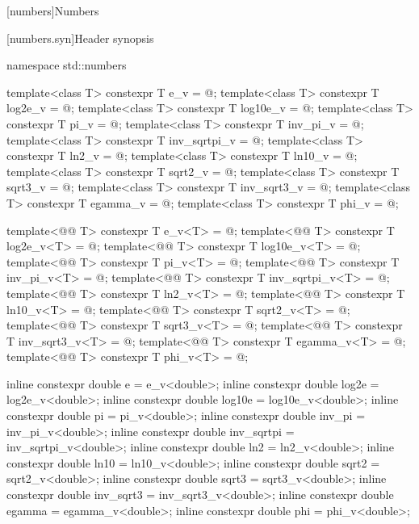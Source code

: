 [numbers]{Numbers}

[numbers.syn]{Header  synopsis}

%
\begin{codeblock}
namespace std::numbers {
  template<class T> constexpr T e_v          = @\unspec@;
  template<class T> constexpr T log2e_v      = @\unspec@;
  template<class T> constexpr T log10e_v     = @\unspec@;
  template<class T> constexpr T pi_v         = @\unspec@;
  template<class T> constexpr T inv_pi_v     = @\unspec@;
  template<class T> constexpr T inv_sqrtpi_v = @\unspec@;
  template<class T> constexpr T ln2_v        = @\unspec@;
  template<class T> constexpr T ln10_v       = @\unspec@;
  template<class T> constexpr T sqrt2_v      = @\unspec@;
  template<class T> constexpr T sqrt3_v      = @\unspec@;
  template<class T> constexpr T inv_sqrt3_v  = @\unspec@;
  template<class T> constexpr T egamma_v     = @\unspec@;
  template<class T> constexpr T phi_v        = @\unspec@;

  template<@@ T> constexpr T e_v<T>          = @\seebelow@;
  template<@@ T> constexpr T log2e_v<T>      = @\seebelow@;
  template<@@ T> constexpr T log10e_v<T>     = @\seebelow@;
  template<@@ T> constexpr T pi_v<T>         = @\seebelow@;
  template<@@ T> constexpr T inv_pi_v<T>     = @\seebelow@;
  template<@@ T> constexpr T inv_sqrtpi_v<T> = @\seebelow@;
  template<@@ T> constexpr T ln2_v<T>        = @\seebelow@;
  template<@@ T> constexpr T ln10_v<T>       = @\seebelow@;
  template<@@ T> constexpr T sqrt2_v<T>      = @\seebelow@;
  template<@@ T> constexpr T sqrt3_v<T>      = @\seebelow@;
  template<@@ T> constexpr T inv_sqrt3_v<T>  = @\seebelow@;
  template<@@ T> constexpr T egamma_v<T>     = @\seebelow@;
  template<@@ T> constexpr T phi_v<T>        = @\seebelow@;

  inline constexpr double e          = e_v<double>;
  inline constexpr double log2e      = log2e_v<double>;
  inline constexpr double log10e     = log10e_v<double>;
  inline constexpr double pi         = pi_v<double>;
  inline constexpr double inv_pi     = inv_pi_v<double>;
  inline constexpr double inv_sqrtpi = inv_sqrtpi_v<double>;
  inline constexpr double ln2        = ln2_v<double>;
  inline constexpr double ln10       = ln10_v<double>;
  inline constexpr double sqrt2      = sqrt2_v<double>;
  inline constexpr double sqrt3      = sqrt3_v<double>;
  inline constexpr double inv_sqrt3  = inv_sqrt3_v<double>;
  inline constexpr double egamma     = egamma_v<double>;
  inline constexpr double phi        = phi_v<double>;
}
\end{codeblock}

